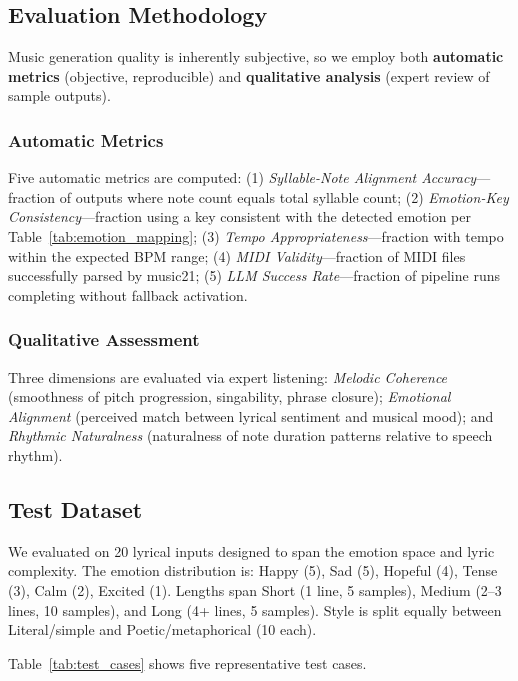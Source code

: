 \documentclass[conference]{IEEEtran}
\begin{document}
\subsection{Evaluation Methodology}

Music generation quality is inherently subjective, so we employ both
\textbf{automatic metrics} (objective, reproducible) and \textbf{qualitative
analysis} (expert review of sample outputs).

\subsubsection{Automatic Metrics}
Five automatic metrics are computed: (1) \textit{Syllable-Note Alignment
Accuracy}---fraction of outputs where note count equals total syllable count;
(2) \textit{Emotion-Key Consistency}---fraction using a key consistent with the
detected emotion per Table~\ref{tab:emotion_mapping}; (3) \textit{Tempo
Appropriateness}---fraction with tempo within the expected BPM range; (4)
\textit{MIDI Validity}---fraction of MIDI files successfully parsed by music21;
(5) \textit{LLM Success Rate}---fraction of pipeline runs completing without
fallback activation.

\subsubsection{Qualitative Assessment}
Three dimensions are evaluated via expert listening: \textit{Melodic
Coherence} (smoothness of pitch progression, singability, phrase closure);
\textit{Emotional Alignment} (perceived match between lyrical sentiment and
musical mood); and \textit{Rhythmic Naturalness} (naturalness of note duration
patterns relative to speech rhythm).

\subsection{Test Dataset}

We evaluated on 20 lyrical inputs designed to span the emotion space and lyric
complexity. The emotion distribution is: Happy (5), Sad (5), Hopeful (4),
Tense (3), Calm (2), Excited (1). Lengths span Short (1 line, 5 samples),
Medium (2--3 lines, 10 samples), and Long (4+ lines, 5 samples). Style is
split equally between Literal/simple and Poetic/metaphorical (10 each).

Table~\ref{tab:test_cases} shows five representative test cases.
\end{document}
